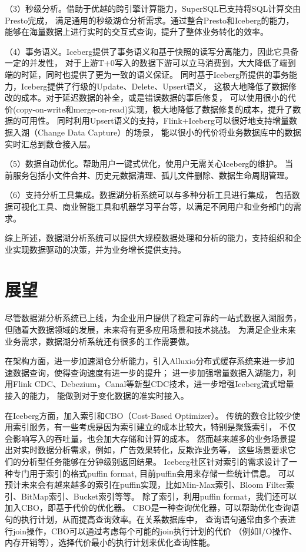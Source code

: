 （3）秒级分析。借助于优越的跨引擎计算能力，SuperSQL已支持将SQL计算交由Presto完成，
满足通用的秒级湖仓分析需求。通过整合Presto和Iceberg的能力，能够在海量数据上进行实时的交互式查询，提升了整体业务转化的效率。

（4）事务语义。Iceberg提供了事务语义和基于快照的读写分离能力，因此它具备一定的并发性，
对于上游T+0写入的数据下游可以立马消费到，大大降低了端到端的时延，同时也提供了更为一致的语义保证。
同时基于Iceberg所提供的事务能力，Iceberg提供了行级的Update、Delete、Upsert语义，
这极大地降低了数据修改的成本。对于延迟数据的补全，或是错误数据的事后修复，
可以使用很小的代价(copy-on-write和merge-on-read)实现，极大地降低了数据修复的成本，提升了数据的可用性。
同时利用Upsert语义的支持，Flink+Iceberg可以很好地支持增量数据入湖（Change Data Capture）的场景，
能以很小的代价将业务数据库中的数据实时汇总到数仓接入层。

（5）数据自动优化。帮助用户一键式优化，使用户无需关心Iceberg的维护。
当前服务包括小文件合并、历史元数据清理、孤儿文件删除、数据生命周期管理。

（6）支持分析工具集成。数据湖分析系统可以与多种分析工具进行集成，
包括数据可视化工具、商业智能工具和机器学习平台等，以满足不同用户和业务部门的需求。

综上所述，数据湖分析系统可以提供大规模数据处理和分析的能力，支持组织和企业实现数据驱动的决策，并为业务增长提供支持。

\section{展望}

尽管数据湖分析系统已上线，为企业用户提供了稳定可靠的一站式数据入湖服务，
但随着大数据领域的发展，未来将有更多应用场景和技术挑战。
为满足企业未来业务需求，数据湖分析系统还有很多的工作需要做。

在架构方面，进一步加速湖仓分析能力，引入Alluxio分布式缓存系统来进一步加速数据查询，使得查询速度有进一步的提升；
进一步加强增量数据入湖能力，利用Flink CDC、Debezium，Canal等新型CDC技术，进一步增强Iceberg流式增量接入的能力，
能做到对于变化数据的准实时接入。

在Iceberg方面，加入索引和CBO（Cost-Based Optimizer）。
传统的数仓比较少使用索引服务，有一些考虑是因为索引建立的成本比较大，特别是聚簇索引，
不仅会影响写入的吞吐量，也会加大存储和计算的成本。
然而越来越多的业务场景提出对实时数据分析需求，例如，广告效果转化，反欺诈业务等，
这些场景要求它们的分析型任务能够在分钟级别返回结果。
Iceberg社区针对索引的需求设计了一种专门用于索引的格式puffin format, 目前puffin会用来存储一些统计信息。
可以预计未来会有越来越多的索引在puffin实现，比如Min-Max索引、Bloom Filter索引、BitMap索引、Bucket索引等等。
除了索引，利用puffin format，我们还可以加入CBO，即基于代价的优化器。
CBO是一种查询优化器，可以帮助优化查询语句的执行计划，从而提高查询效率。在关系数据库中，
查询语句通常由多个表进行join操作，CBO可以通过考虑每个可能的join执行计划的代价
（例如I/O操作、内存开销等），选择代价最小的执行计划来优化查询性能。

